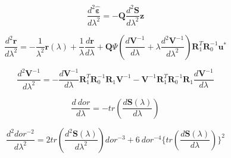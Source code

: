 \documentclass[11pt,twoside]{report}
\begin{document}
\begin{equation}
\frac{d^2\hat{\mathbold{\varepsilon}}}{d\lambda^2}=-\textbf{Q}\frac{d^2\textbf{S}}{d\lambda^2}\textbf{z}
\end{equation}

\begin{equation}
\frac{d^2\textbf{r}}{d\lambda^2}=-\frac{1}{\lambda^2}\textbf{r}(\lambda)+\frac{1}{\lambda}\frac{d\textbf{r}}{d\lambda}+\textbf{Q}\Psi (\frac{d\textbf{V}^{-1}}{d\lambda} +\lambda \frac{d^2\textbf{V}^{-1}}{d\lambda^2})\textbf{R}_1^T\textbf{R}_0^{-1}\textbf{u}^{*}
\end{equation}

\begin{equation}
\frac{d^2\textbf{V}^{-1}}{d\lambda^2}=-\frac{d\textbf{V}^{-1}}{d\lambda}\textbf{R}_1^T\textbf{R}_0^{-1}\textbf{R}_1 \textbf{V}^{-1}-\textbf{V}^{-1}\textbf{R}_1^T\textbf{R}_0^{-1}\textbf{R}_1\frac{d\textbf{V}^{-1}}{d\lambda}
\end{equation}

\begin{equation}
\frac{d\ dor}{d\lambda}=-tr(\frac{d\textbf{S}(\lambda)}{d\lambda})
\end{equation}


\begin{equation}
\frac{d^2 dor^{-2}}{d\lambda^2}=2tr(\frac{d^2\textbf{S}(\lambda)}{d\lambda^2})dor^{-3}+6\ dor^{-4}\{tr(\frac{d\textbf{S}(\lambda)}{d\lambda})\}^2
\end{equation}
\end{document}
